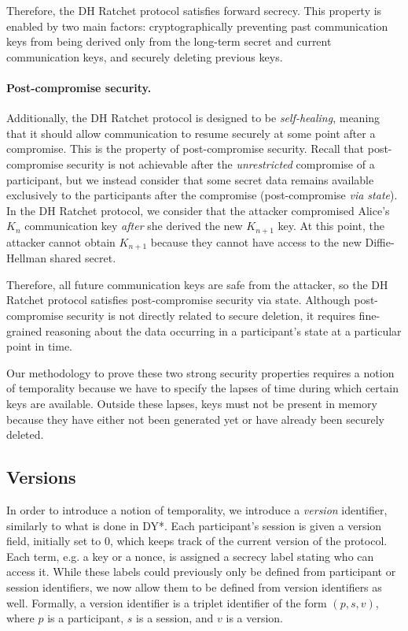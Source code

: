 Therefore, the DH Ratchet protocol satisfies forward secrecy. This property is enabled by two main factors: cryptographically preventing past communication keys from being derived only from the long-term secret and current communication keys, and securely deleting previous keys.

\paragraph{Post-compromise security.}
\label{sec:post-compromise-security}

Additionally, the DH Ratchet protocol is designed to be \emph{self-healing}, meaning that it should allow communication to resume securely at some point after a compromise. This is the property of post-compromise security.
Recall that post-compromise security is not achievable after the \emph{unrestricted} compromise of a participant, but we instead consider that some secret data remains available exclusively to the participants after the compromise (post-compromise \emph{via state}).
In the DH Ratchet protocol, we consider that the attacker compromised Alice's $K_n$ communication key \emph{after} she derived the new $K_{n+1}$ key. At this point, the attacker cannot obtain $K_{n+1}$ because they cannot have access to the new Diffie-Hellman shared secret. 

Therefore, all future communication keys are safe from the attacker, so the DH Ratchet protocol satisfies post-compromise security via state.
Although post-compromise security is not directly related to secure deletion, it requires fine-grained reasoning about the data occurring in a participant's state at a particular point in time.

Our methodology to prove these two strong security properties requires a notion of temporality because we have to specify the lapses of time during which certain keys are available. Outside these lapses, keys must not be present in memory because they have either not been generated yet or have already been securely deleted.

\subsection{Versions}
\label{sec:versions}

In order to introduce a notion of temporality, we introduce a \emph{version} identifier, similarly to what is done in DY*. Each participant's session is given a version field, initially set to $0$, which keeps track of the current version of the protocol.
Each term, e.g. a key or a nonce, is assigned a secrecy label stating who can access it. While these labels could previously only be defined from participant or session identifiers, we now allow them to be defined from version identifiers as well. Formally, a version identifier is a triplet identifier of the form $(p, s, v)$, where $p$ is a participant, $s$ is a session, and $v$ is a version.

